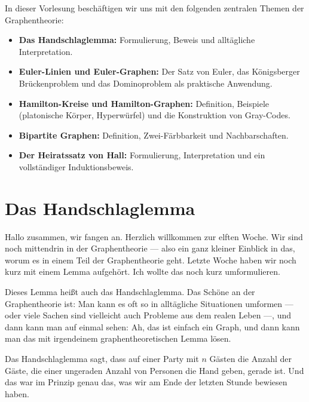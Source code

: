 

\begin{nice-box}
In dieser Vorlesung beschäftigen wir uns mit den folgenden zentralen Themen der Graphentheorie:
\begin{itemize}
    \item \textbf{Das Handschlaglemma:} Formulierung, Beweis und alltägliche Interpretation.
    \item \textbf{Euler-Linien und Euler-Graphen:} Der Satz von Euler, das Königsberger Brückenproblem und das Dominoproblem als praktische Anwendung.
    \item \textbf{Hamilton-Kreise und Hamilton-Graphen:} Definition, Beispiele (platonische Körper, Hyperwürfel) und die Konstruktion von Gray-Codes.
    \item \textbf{Bipartite Graphen:} Definition, Zwei-Färbbarkeit und Nachbarschaften.
    \item \textbf{Der Heiratssatz von Hall:} Formulierung, Interpretation und ein vollständiger Induktionsbeweis.
\end{itemize}
\end{nice-box}

\section{Das Handschlaglemma}

\begin{spoken-clean}[00:00:00 - 00:01:58]
Hallo zusammen, wir fangen an. Herzlich willkommen zur elften Woche. Wir sind noch mittendrin in der Graphentheorie --- also ein ganz kleiner Einblick in das, worum es in einem Teil der Graphentheorie geht. Letzte Woche haben wir noch kurz mit einem Lemma aufgehört. Ich wollte das noch kurz umformulieren. 

Dieses Lemma heißt auch das Handschlaglemma. Das Schöne an der Graphentheorie ist: Man kann es oft so in alltägliche Situationen umformen --- oder viele Sachen sind vielleicht auch Probleme aus dem realen Leben ---, und dann kann man auf einmal sehen: Ah, das ist einfach ein Graph, und dann kann man das mit irgendeinem graphentheoretischen Lemma lösen. 

Das Handschlaglemma sagt, dass auf einer Party mit $n$ Gästen die Anzahl der Gäste, die einer ungeraden Anzahl von Personen die Hand geben, gerade ist. Und das war im Prinzip genau das, was wir am Ende der letzten Stunde bewiesen haben.
\end{spoken-clean}

